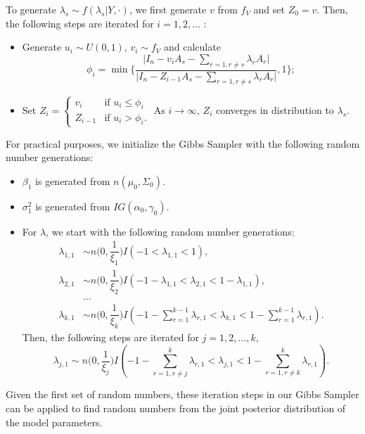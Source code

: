 \documentclass[times, doublespace]{auth}
\begin{document}
	\noindent To generate $\lambda_{s} \sim f(\lambda_{s} \vert Y, \cdot)$, we first generate $v$ from $f_{V}$ and set $Z_{0} = v$. Then, the following steps are iterated for $i=1,2,\ldots$ :
	\begin{itemize}
		\item Generate $u_{i} \sim U(0,1)$, $v_{i} \sim f_{V}$ and calculate
		\[
		\phi_{i} = \min\bigg\{\dfrac{\bigg\vert I_{n} - v_{i}A_{s} - \sum\limits_{r=1, r \ne s}\lambda_{r}A_{r}\bigg\vert}{\bigg\vert I_{n} - Z_{i-1}A_{s} - \sum\limits_{r=1, r \ne s}\lambda_{r}A_{r}\bigg\vert},1\bigg\};
		\]
		\item Set $Z_{i} = \begin{cases} v_{i} & \text{if }u_{i} \le \phi_{i}\\ Z_{i-1} & \text{if }u_{i} > \phi_{i}.\end{cases}$ As $i \rightarrow \infty$, $Z_{i}$ converges in distribution to $\lambda_{s}$.
	\end{itemize}

For practical purposes, we initialize the Gibbs Sampler with the following random number generations:
\begin{itemize}
	\item $\beta_{1}$ is generated from $n(\mu_{0}, \Sigma_{0})$.
	\item $\sigma_{1}^{2}$ is generated from $IG(\alpha_{0}, \gamma_{0})$.
	\item For $\lambda$, we start with the following random number generations:
	\[
	\begin{array}{rl}
	\lambda_{1,1} &\sim n\bigg(0,\dfrac{1}{\xi_{1}}\bigg)I(-1 < \lambda_{1,1} < 1),\\
	\lambda_{2,1} &\sim n\bigg(0,\dfrac{1}{\xi_{2}}\bigg)I(-1-\lambda_{1,1} < \lambda_{2,1} < 1-\lambda_{1,1}),\\
	&\ldots\\ 
	\lambda_{k,1} &\sim n\bigg(0,\dfrac{1}{\xi_{k}}\bigg)I(-1-\sum\limits_{r=1}^{k-1}\lambda_{r,1} < \lambda_{k,1} < 1-\sum\limits_{r=1}^{k-1}\lambda_{r,1}).
	\end{array}
	\]
	Then, the following steps are iterated for $j = 1,2,\ldots,k$,
	\[
	\lambda_{j,1} \sim n\bigg(0,\dfrac{1}{\xi_{j}}\bigg)I(-1-\sum\limits_{r=1, r \ne j}^{k}\lambda_{r,1} < \lambda_{j,1} < 1-\sum\limits_{r=1, r \ne k}^{k}\lambda_{r,1}).
	\]
\end{itemize}
Given the first set of random numbers, these iteration steps in our Gibbs Sampler can be applied to find random numbers from the joint posterior distribution of the model parameters.
\newline
\end{document}
